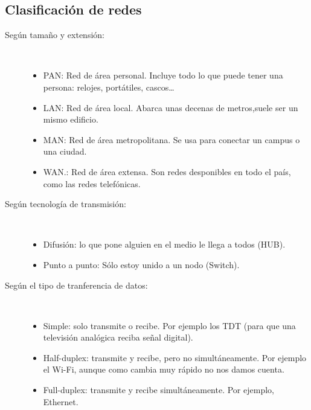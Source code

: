 \subsection{Clasificación de redes}
\begin{description}
    \item[Según tamaño y extensión:] \
    \begin{itemize}
        \item \acrfull{PAN}: Red de área personal. Incluye todo lo que puede tener una persona: relojes, portátiles, cascos\ldots
        \item \acrfull{LAN}: Red de área local. Abarca unas decenas de metros,suele ser un mismo edificio. 
        \item \acrfull{MAN}: Red de área metropolitana. Se usa para conectar un campus o una ciudad. 
        \item \acrfull{WAN}.: Red de área extensa. Son redes desponibles en todo el país, como las redes telefónicas.
    \end{itemize}
    \item[Según tecnología de transmisión:]\
    \begin{itemize}
        \item Difusión: lo que pone alguien en el medio le llega a todos (HUB\@).
        \item Punto a punto: Sólo estoy unido a un nodo (Switch).
    \end{itemize}
    \item[Según el tipo de tranferencia de datos:] \
    \begin{itemize}
        \item Simple: solo transmite o recibe. Por ejemplo los TDT (para que una televisión analógica reciba señal digital).
        \item Half-duplex: transmite y recibe, pero no simultáneamente. Por ejemplo el Wi-Fi, aunque como cambia muy rápido  no nos damos cuenta.
        \item Full-duplex: transmite y recibe simultáneamente. Por ejemplo, Ethernet. 
    \end{itemize}
\end{description}

